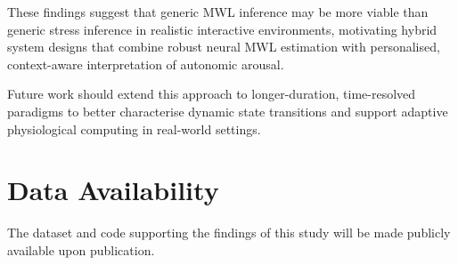 \documentclass[lettersize,journal]{IEEEtran}
\begin{document}
These findings suggest that generic MWL inference may be more viable than generic stress inference in realistic interactive environments, motivating hybrid system designs that combine robust neural MWL estimation with personalised, context-aware interpretation of autonomic arousal. 

Future work should extend this approach to longer-duration, time-resolved paradigms to better characterise dynamic state transitions and support adaptive physiological computing in real-world settings.


\section*{Data Availability}
The dataset and code supporting the findings of this study will be made publicly available upon publication.



\end{document}
